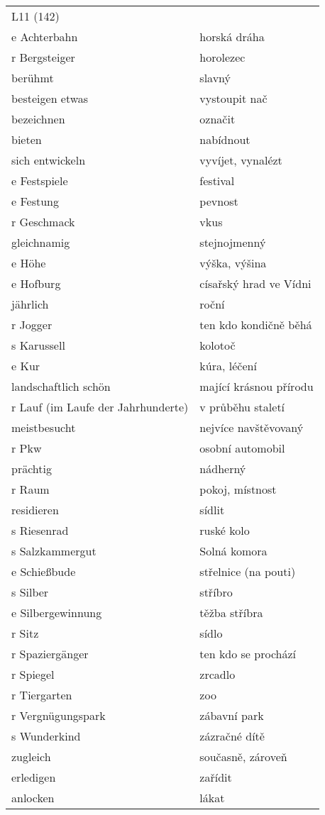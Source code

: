 \documentclass{article}
\begin{document}
\begin{tabular}{ p{5cm}|p{5cm}  }
\end{tabular}

\begin{tabular}{ p{5cm}|p{5cm}  }
    \\
    L11 (142) \\
    e Achterbahn & horská dráha\\
    r Bergsteiger & horolezec\\
    berühmt & slavný\\
    besteigen etwas & vystoupit nač\\
    bezeichnen & označit\\
    bieten & nabídnout\\
    sich entwickeln & vyvíjet, vynalézt\\
    e Festspiele & festival\\
    e Festung & pevnost\\
    r Geschmack & vkus\\ 
    gleichnamig & stejnojmenný\\
    e Höhe & výška, výšina\\
    e Hofburg & císařský hrad ve Vídni\\
    jährlich & roční\\
    r Jogger & ten kdo kondičně běhá\\
    s Karussell & kolotoč\\
    e Kur & kúra, léčení\\
    landschaftlich schön & mající krásnou přírodu\\
    r Lauf (im Laufe der Jahrhunderte) & v průběhu staletí\\
    meistbesucht & nejvíce navštěvovaný\\
    r Pkw & osobní automobil\\
    prächtig & nádherný\\
    r Raum & pokoj, místnost\\
    residieren & sídlit\\
    s Riesenrad & ruské kolo\\
    s Salzkammergut & Solná komora\\
    e Schie{\ss}bude & střelnice (na pouti)\\
    s Silber & stříbro\\
    e Silbergewinnung & těžba stříbra\\
    r Sitz & sídlo\\
    r Spaziergänger & ten kdo se prochází\\
    r Spiegel & zrcadlo\\
    r Tiergarten & zoo\\
    r Vergnügungspark & zábavní park\\
    s Wunderkind & zázračné dítě\\
    zugleich & současně, zároveň\\
    erledigen & zařídit\\
    anlocken & lákat\\
\end{tabular}
\end{document}
